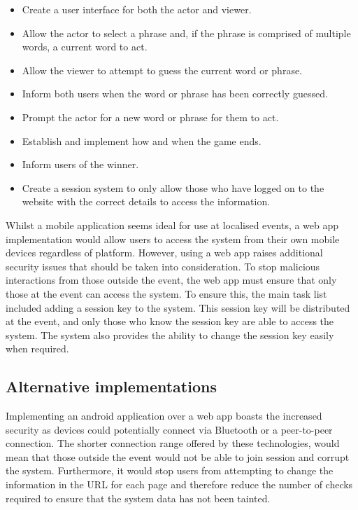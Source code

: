 \begin{itemize}
	\item Create a user interface for both the actor and viewer.

	\item Allow the actor to select a phrase and, if the phrase is comprised of multiple words, a current word to act.

	\item Allow the viewer to attempt to guess the current word or phrase.

	\item Inform both users when the word or phrase has been correctly guessed.

	\item Prompt the actor for a new word or phrase for them to act.

	\item Establish and implement how and when the game ends.

	\item Inform users of the winner.

	\item Create a session system to only allow those who have logged on to the website with the correct details to access the information.

\end{itemize}

Whilst a mobile application seems ideal for use at localised events, a web app implementation would allow users to access the system from their own mobile devices regardless of platform. However, using a web app raises additional security issues that should be taken into consideration. To stop malicious interactions from those outside the event, the web app must ensure that only those at the event can access the system. To ensure this, the main task list included adding a session key to the system. This session key will be distributed at the event, and only those who know the session key are able to access the system. The system also provides the ability to change the session key easily when required.

\subsection{Alternative implementations}
Implementing an android application over a web app boasts the increased security as devices could potentially connect via Bluetooth or a peer-to-peer connection. The shorter connection range offered by these technologies, would mean that those outside the event would not be able to join session and corrupt the system. Furthermore, it would stop users from attempting to change the information in the URL for each page and therefore reduce the number of checks required to ensure that the system data has not been tainted.

